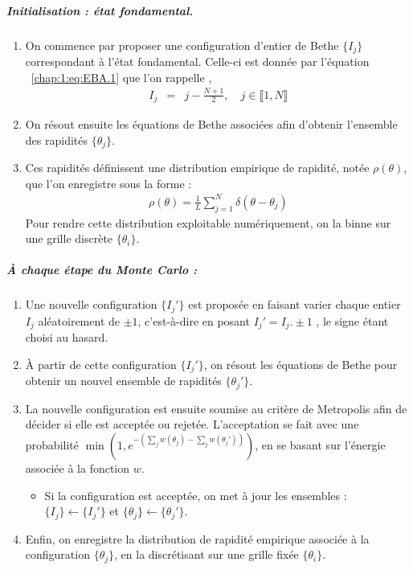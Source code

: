 \subparagraph{Initialisation : état fondamental.}
\begin{enumerate}
    \item On commence par proposer une configuration d'entier de Bethe  \( \{I_j\} \) correspondant à l’état fondamental. Celle-ci est donnée par l'équation ~\eqref{chap:1:eq:EBA.1} que l'on rappelle ,
		\begin{eqnarray}
			I_j & = & j - \frac{N+1}{2}, \quad j \in \llbracket 1 , N \rrbracket	
		\end{eqnarray}

    \item On résout ensuite les équations de Bethe associées afin d'obtenir l’ensemble des rapidités \( \{ \theta_j \} \).

	\item Ces rapidités définissent une distribution empirique de rapidité, notée \( \rho(\theta) \), que l’on enregistre sous la forme :
	\begin{eqnarray}
    	\rho(\theta) = \frac{1}{L} \sum_{j=1}^N \delta(\theta - \theta_j)
	\end{eqnarray}
	Pour rendre cette distribution exploitable numériquement, on la binne sur une grille discrète \( \{ \theta_i \} \).
\end{enumerate}

\subparagraph{À chaque étape du Monte Carlo :}
\begin{enumerate}
    \item Une nouvelle configuration  \( \{I_j'\} \) est proposée en faisant varier chaque entier $I_j$ aléatoirement de $\pm 1$, c’est-à-dire en posant  $I_j' = I_j. \pm 1 $ , le signe étant choisi au hasard.
    \item À partir de cette configuration \( \{I_j'\} \), on résout les équations de Bethe pour obtenir un nouvel ensemble de rapidités \( \{ \theta_j' \} \).

	\item La nouvelle configuration est ensuite soumise au critère de Metropolis afin de décider si elle est acceptée ou rejetée. L’acceptation se fait avec une probabilité \( \min\left(1 , e^{- \left(\sum_j w(\theta_j) - \sum_j w(\theta_j')\right)}\right) \), en se basant sur l’énergie associée à la fonction \( w \).
	\begin{itemize}[label = $\bullet$]
    	\item Si la configuration est acceptée, on met à jour les ensembles : \( \{I_j\} \leftarrow \{I_j'\} \) et \( \{\theta_j\} \leftarrow \{\theta_j'\} \).
	\end{itemize}

	\item Enfin, on enregistre la distribution de rapidité empirique associée à la configuration \( \{\theta_j\} \), en la discrétisant sur une grille fixée \( \{\theta_i\} \).

\end{enumerate}


